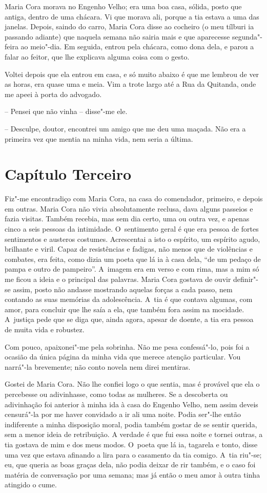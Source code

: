 Maria Cora morava no Engenho Velho; era uma boa casa, sólida, posto que
antiga, dentro de uma chácara. Vi que morava ali, porque a tia estava a
uma das janelas. Depois, saindo do carro, Maria Cora disse ao cocheiro
(o meu tílburi ia passando adiante) que naquela semana não sairia mais e
que aparecesse segunda"-feira ao meio"-dia. Em seguida, entrou pela
chácara, como dona dela, e parou a falar ao feitor, que lhe explicava
alguma coisa com o gesto.

Voltei depois que ela entrou em casa, e só muito abaixo é que me lembrou
de ver as horas, era quase uma e meia. Vim a trote largo até a Rua da
Quitanda, onde me apeei à porta do advogado.

-- Pensei que não vinha -- disse"-me ele.

-- Desculpe, doutor, encontrei um amigo que me deu uma maçada. Não era a
primeira vez que mentia na minha vida, nem seria a última.

\section{Capítulo Terceiro}

Fiz"-me encontradiço com Maria Cora, na casa do comendador, primeiro, e
depois em outras. Maria Cora não vivia absolutamente reclusa, dava
alguns passeios e fazia visitas. Também recebia, mas sem dia certo, uma
ou outra vez, e apenas cinco a seis pessoas da intimidade. O~sentimento
geral é que era pessoa de fortes sentimentos e austeros costumes.
Acrescentai a isto o espírito, um espírito agudo, brilhante e viril.
Capaz de resistências e fadigas, não menos que de violências e combates,
era feita, como dizia um poeta que lá ia à casa dela, ``de um pedaço de
pampa e outro de pampeiro''. A~imagem era em verso e com rima, mas a mim
só me ficou a ideia e o principal das palavras. Maria Cora gostava de
ouvir definir"-se assim, posto não andasse mostrando aquelas forças a
cada passo, nem contando as suas memórias da adolescência. A~tia é que
contava algumas, com amor, para concluir que lhe saía a ela, que também
fora assim na mocidade. A~justiça pede que se diga que, ainda agora,
apesar de doente, a tia era pessoa de muita vida e robustez.

Com pouco, apaixonei"-me pela sobrinha. Não me pesa confessá"-lo, pois foi
a ocasião da única página da minha vida que merece atenção particular.
Vou narrá"-la brevemente; não conto novela nem direi mentiras.

Gostei de Maria Cora. Não lhe confiei logo o que sentia, mas é provável
que ela o percebesse ou adivinhasse, como todas as mulheres. Se a
descoberta ou adivinhação foi anterior à minha ida à casa do Engenho
Velho, nem assim deveis censurá"-la por me haver convidado a ir ali uma
noite. Podia ser"-lhe então indiferente a minha disposição moral, podia
também gostar de se sentir querida, sem a menor ideia de retribuição. A
verdade é que fui essa noite e tornei outras, a tia gostava de mim e dos
meus modos. O~poeta que lá ia, tagarela e tonto, disse uma vez que
estava afinando a lira para o casamento da tia comigo. A~tia riu"-se; eu,
que queria as boas graças dela, não podia deixar de rir também, e o caso
foi matéria de conversação por uma semana; mas já então o meu amor à
outra tinha atingido o cume.

